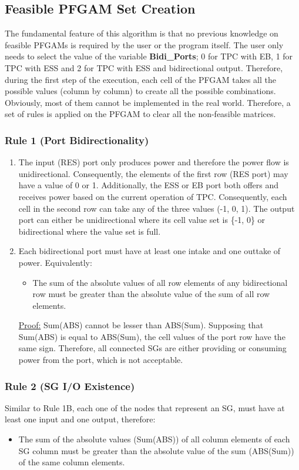 \documentclass[conference]{IEEEtran}
\begin{document}
\subsection{Feasible PFGAM Set Creation}
The fundamental feature of this algorithm is that no previous knowledge on feasible PFGAMs is required by the user or the program itself. The user only needs to select the value of the variable \textbf{Bidi\_Ports}; 0 for TPC with EB, 1 for TPC with ESS and 2 for TPC with ESS and bidirectional output. Therefore, during the first step of the execution, each cell of the PFGAM takes all the possible values (column by column) to create all the possible combinations. Obviously, most of them cannot be implemented in the real world. Therefore, a set of rules is applied on the PFGAM to clear all the non-feasible matrices.
\subsubsection{Rule 1 (Port Bidirectionality)}
\begin{enumerate}[label=\Alph*)]
    \item The input (RES) port only produces power and therefore the power flow is unidirectional. Consequently, the elements of the first row (RES port) may have a value of 0 or 1. Additionally, the ESS or EB port both offers and receives power based on the current operation of TPC. Consequently, each cell in the second row can take any of the three values (-1, 0, 1). The output port can either be unidirectional where its cell value set is \{-1, 0\} or bidirectional where the value set is full. 
    \item Each bidirectional port must have at least one intake and one outtake of power. Equivalently:
    \begin{itemize}   
    \item The sum of the absolute values of all row elements of any bidirectional row must be greater than the absolute value of the sum of all row elements. 
    \end{itemize}
    \underline{Proof:} Sum(ABS) cannot be lesser than ABS(Sum). Supposing that Sum(ABS) is equal to ABS(Sum), the cell values of the port row have the same sign. Therefore, all connected SGs are either providing or consuming power from the port, which is not acceptable.
\end{enumerate}
\subsubsection{Rule 2 (SG I/O Existence)}
Similar to Rule 1B, each one of the nodes that represent an SG, must have at least one input and one output, therefore:
\begin{itemize}
    \item The sum of the absolute values (Sum(ABS)) of all column elements of each SG column must be greater than the absolute value of the sum (ABS(Sum)) of the same column elements. 
\end{itemize}
\end{document}
